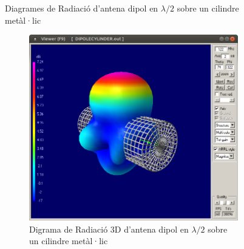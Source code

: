 \begin{figure}[H]
\begin{subfigure}[b]{0.32\textwidth}
	  \caption{}
	  \label{1diag2}
	  \end{subfigure}
	  \vspace{10pt}
	\caption{Diagrames de Radiació d'antena dipol en $\lambda/2$ sobre un cilindre metàl·lic}
	\label{diag1}
	\end{figure}

	\begin{figure}[H]
	\centering
	  \begin{subfigure}[b]{0.53\textwidth}
	  \includegraphics[width=\textwidth]{./images/3.Dypole_cylinder/3_3d.png}
	  \caption{Digrama de Radiació 3D d'antena dipol en $\lambda/2$ sobre un cilindre metàl·lic}
	  \label{1diag3d}
	  \end{subfigure}
	  \qquad %
	  \begin{subfigure}[b]{0.32\textwidth}

\end{subfigure}
\end{figure}
